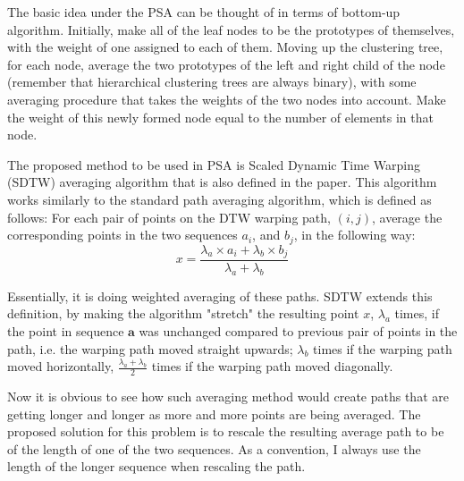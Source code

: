\documentclass[parskip]{cs4rep}
\begin{document}
The basic idea under the PSA can be thought of in terms of bottom-up algorithm.
Initially, make all of the leaf nodes to be the prototypes of themselves, with the weight of one assigned to each of them. Moving up the clustering tree, for each node, average the two prototypes of the left and right child of the node (remember that hierarchical clustering trees are always binary), with some averaging procedure that takes the weights of the two nodes into account. Make the weight of this newly formed node equal to the number of elements in that node.

The proposed method to be used in PSA is Scaled Dynamic Time Warping (SDTW) averaging algorithm that is also defined in the paper. This algorithm works similarly to the standard path averaging algorithm, which is defined as follows: For each pair of points on the DTW warping path, $(i,j)$, average the corresponding points in the two sequences $a_i$, and $b_j$, in the following way:
\begin{equation} \label{eq:standard_path_averaging}
 x =  \frac{\lambda_a \times a_i + \lambda_b \times b_j}{\lambda_a + \lambda_b}
\end{equation}

Essentially, it is doing weighted averaging of these paths.
SDTW extends this definition, by making the algorithm "stretch" the resulting point $x$,  $\lambda_a$ times, if the point in sequence $\mathbf{a}$ was unchanged compared to previous pair of points in the path, i.e. the warping path moved straight upwards; $\lambda_b$ times if the warping path moved horizontally, $\frac{\lambda_a + \lambda_b}{2}$ times if the warping path moved diagonally.

Now it is obvious to see how such averaging method would create paths that are getting longer and longer as more and more points are being averaged. The proposed solution for this problem is to rescale the resulting average path to be of the length of one of the two sequences. As a convention, I always use the length of the longer sequence when rescaling the path.
\end{document}
